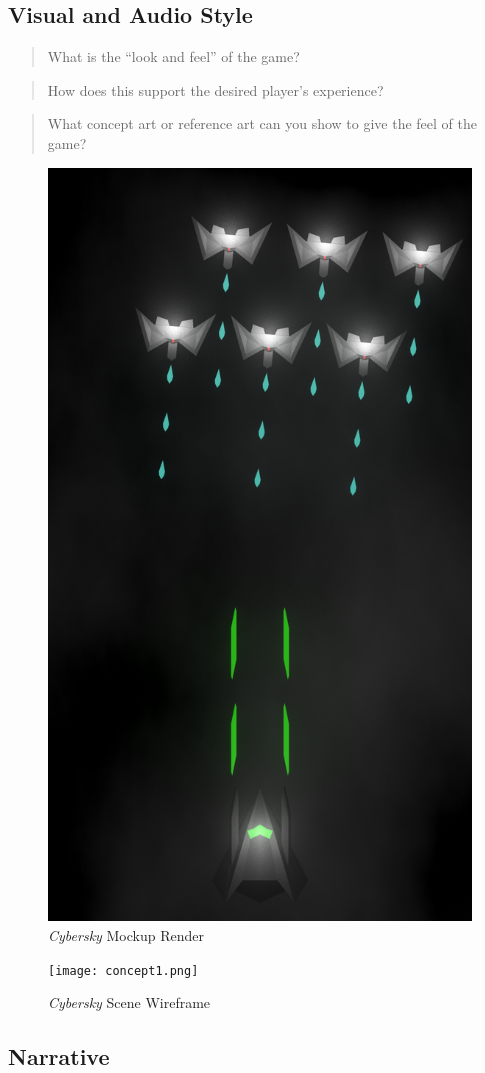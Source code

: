 \documentclass{scrartcl}
\begin{document}
\subsection{Visual and Audio Style}
\begin{quote}
  What is the “look and feel” of the game?
\end{quote}

\begin{quote}
  How does this support the desired player’s experience?
\end{quote}

\begin{quote}
  What concept art or reference art can you show to give the feel of the game?
\end{quote}

\begin{figure}[!ht]
  \centering
  \includegraphics[width=.5\columnwidth]{mockup-01.png}
  \caption[\textit{Cybersky}]{\textit{Cybersky} Mockup Render}
\end{figure}

\begin{figure}[!ht]
  \centering
  \texttt{[image: concept1.png]}
  \caption[\textit{Cybersky}]{\textit{Cybersky} Scene Wireframe}
\end{figure}

\subsection{Narrative}
\end{document}
